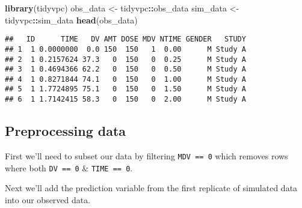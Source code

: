\documentclass[
]{book}
\newenvironment{Shaded}{\begin{snugshade}}{\end{snugshade}}
\newcommand{\DecValTok}[1]{\textcolor[rgb]{0.00,0.00,0.81}{#1}}
\newcommand{\KeywordTok}[1]{\textcolor[rgb]{0.13,0.29,0.53}{\textbf{#1}}}
\newcommand{\NormalTok}[1]{#1}
\newcommand{\OperatorTok}[1]{\textcolor[rgb]{0.81,0.36,0.00}{\textbf{#1}}}
\newcommand{\StringTok}[1]{\textcolor[rgb]{0.31,0.60,0.02}{#1}}
\begin{document}
\begin{Shaded}
\begin{Highlighting}[]
\KeywordTok{library}\NormalTok{(tidyvpc)}
\NormalTok{obs_data <-}\StringTok{ }\NormalTok{tidyvpc}\OperatorTok{::}\NormalTok{obs_data}
\NormalTok{sim_data <-}\StringTok{ }\NormalTok{tidyvpc}\OperatorTok{::}\NormalTok{sim_data}
\KeywordTok{head}\NormalTok{(obs_data)}
\end{Highlighting}
\end{Shaded}

\begin{verbatim}
##   ID      TIME   DV AMT DOSE MDV NTIME GENDER   STUDY
## 1  1 0.0000000  0.0 150  150   1  0.00      M Study A
## 2  1 0.2157624 37.3   0  150   0  0.25      M Study A
## 3  1 0.4694366 62.2   0  150   0  0.50      M Study A
## 4  1 0.8271844 74.1   0  150   0  1.00      M Study A
## 5  1 1.7724895 75.1   0  150   0  1.50      M Study A
## 6  1 1.7142415 58.3   0  150   0  2.00      M Study A
\end{verbatim}

\hypertarget{preprocessing-data}{%
\subsection{Preprocessing data}\label{preprocessing-data}}

First we'll need to subset our data by filtering \texttt{MDV\ ==\ 0} which removes rows where both \texttt{DV\ ==\ 0} \& \texttt{TIME\ ==\ 0}.

\begin{Shaded}
\end{Shaded}

Next we'll add the prediction variable from the first replicate of simulated data into our observed data.

\begin{Shaded}
\end{Shaded}
\end{document}

